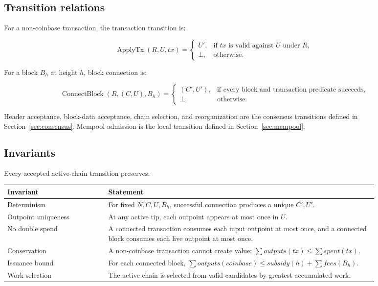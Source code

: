 \subsection{Transition relations}

For a non-coinbase transaction, the transaction transition is:

\[
  \operatorname{ApplyTx}(R,U,tx) =
  \begin{cases}
    U', & \text{if } tx \text{ is valid against } U \text{ under } R,\\
    \bot, & \text{otherwise.}
  \end{cases}
\]

For a block \(B_h\) at height \(h\), block connection is:

\[
  \operatorname{ConnectBlock}(R,(C,U),B_h) =
  \begin{cases}
    (C',U'), & \text{if every block and transaction predicate succeeds,}\\
    \bot, & \text{otherwise.}
  \end{cases}
\]

Header acceptance, block-data acceptance, chain selection, and reorganization
are the consensus transitions defined in Section~\ref{sec:consensus}. Mempool
admission is the local transition defined in Section~\ref{sec:mempool}.

\subsection{Invariants}

Every accepted active-chain transition preserves:

\begin{longtable}{@{}L{0.24\linewidth}L{0.64\linewidth}@{}}
\toprule
Invariant & Statement \\
\midrule
Determinism & For fixed \(N,C,U,B_h\), successful connection produces a unique \(C',U'\). \\
Outpoint uniqueness & At any active tip, each outpoint appears at most once in \(U\). \\
No double spend & A connected transaction consumes each input outpoint at most once, and a connected block consumes each live outpoint at most once. \\
Conservation & A non-coinbase transaction cannot create value: \(\sum outputs(tx) \le \sum spent(tx)\). \\
Issuance bound & For each connected block, \(\sum outputs(coinbase) \le subsidy(h)+\sum fees(B_h)\). \\
Work selection & The active chain is selected from valid candidates by greatest accumulated work. \\
\bottomrule
\end{longtable}
